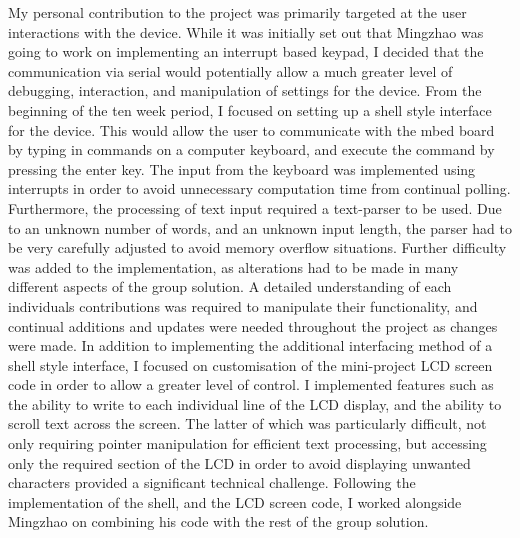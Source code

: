 My personal contribution to the project was primarily targeted at the user 
interactions with the device. While it was initially set out that Mingzhao was 
going to work on implementing an interrupt based keypad, I decided that the 
communication via serial would potentially allow a much greater level of 
debugging, interaction, and manipulation of settings for the device. From the 
beginning of the ten week period, I focused on setting up a shell style interface 
for the device. This would allow the user to communicate with the mbed board by 
typing in commands on a computer keyboard, and execute the command by pressing 
the enter key. The input from the keyboard was implemented using interrupts in 
order to avoid unnecessary computation time from continual polling. 
Furthermore, the processing of text input required a text-parser to be used. 
Due to an unknown number of words, and an unknown input length, the parser had 
to be very carefully adjusted to avoid memory overflow situations. Further 
difficulty was added to the implementation, as alterations had to be made in many 
different aspects of the group solution. A detailed understanding of each 
individuals contributions was required to manipulate their functionality, and 
continual additions and updates were needed throughout the project as changes 
were made. 
In addition to implementing the additional interfacing method of a shell style 
interface, I focused on customisation of the mini-project LCD screen code in 
order to allow a greater level of control. I implemented features such as the 
ability to write to each individual line of the LCD display, and the ability to 
scroll text across the screen. 
The latter of which was particularly difficult, not only requiring pointer 
manipulation for efficient text processing, but accessing only the required 
section of the LCD in order to avoid displaying unwanted characters provided 
a significant technical challenge. Following the implementation of the shell, and 
the LCD screen code, 
I worked alongside Mingzhao on combining his code with 
the rest of the group solution. 

